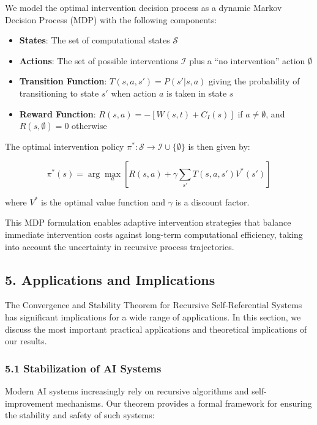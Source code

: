 \documentclass[
]{article}
\providecommand{\tightlist}{%
  \setlength{\itemsep}{0pt}\setlength{\parskip}{0pt}}
\begin{document}
We model the optimal intervention decision process as a dynamic Markov
Decision Process (MDP) with the following components:

\begin{itemize}
\tightlist
\item
  \textbf{States}: The set of computational states \(\mathcal{S}\)
\item
  \textbf{Actions}: The set of possible interventions \(\mathcal{I}\)
  plus a ``no intervention'' action \(\emptyset\)
\item
  \textbf{Transition Function}: \(T(s, a, s') = P(s' | s, a)\) giving
  the probability of transitioning to state \(s'\) when action \(a\) is
  taken in state \(s\)
\item
  \textbf{Reward Function}: \(R(s, a) = -[W(s, t) + C_I(s)]\) if
  \(a \neq \emptyset\), and \(R(s, \emptyset) = 0\) otherwise
\end{itemize}

The optimal intervention policy
\(\pi^*: \mathcal{S} \rightarrow \mathcal{I} \cup \{\emptyset\}\) is
then given by:

\[\pi^*(s) = \arg\max_a \left[ R(s, a) + \gamma \sum_{s'} T(s, a, s') V^*(s') \right]\]

where \(V^*\) is the optimal value function and \(\gamma\) is a discount
factor.

This MDP formulation enables adaptive intervention strategies that
balance immediate intervention costs against long-term computational
efficiency, taking into account the uncertainty in recursive process
trajectories.

\subsection{5. Applications and
Implications}\label{applications-and-implications}

The Convergence and Stability Theorem for Recursive Self-Referential
Systems has significant implications for a wide range of applications.
In this section, we discuss the most important practical applications
and theoretical implications of our results.

\subsubsection{5.1 Stabilization of AI
Systems}\label{stabilization-of-ai-systems}

Modern AI systems increasingly rely on recursive algorithms and
self-improvement mechanisms. Our theorem provides a formal framework for
ensuring the stability and safety of such systems:
\end{document}
